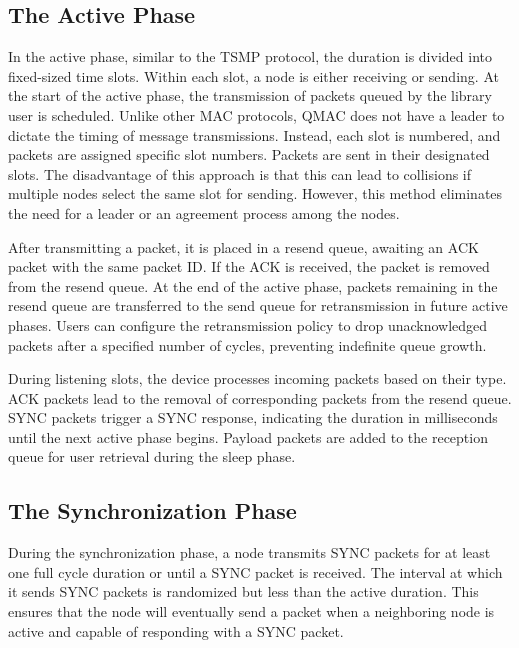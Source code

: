 \subsection*{The Active Phase}

In the active phase, similar to the TSMP protocol, the duration is divided into fixed-sized time slots. Within each slot, a node is either receiving or sending. At the start of the active phase, the transmission of packets queued by the library user is scheduled. Unlike other MAC protocols, QMAC does not have a leader to dictate the timing of message transmissions. Instead, each slot is numbered, and packets are assigned specific slot numbers. Packets are sent in their designated slots. The disadvantage of this approach is that this can lead to collisions if multiple nodes select the same slot for sending. However, this method eliminates the need for a leader or an agreement process among the nodes.

After transmitting a packet, it is placed in a resend queue, awaiting an ACK packet with the same packet ID. If the ACK is received, the packet is removed from the resend queue. At the end of the active phase, packets remaining in the resend queue are transferred to the send queue for retransmission in future active phases. Users can configure the retransmission policy to drop unacknowledged packets after a specified number of cycles, preventing indefinite queue growth.

During listening slots, the device processes incoming packets based on their type. ACK packets lead to the removal of corresponding packets from the resend queue. SYNC packets trigger a SYNC response, indicating the duration in milliseconds until the next active phase begins. Payload packets are added to the reception queue for user retrieval during the sleep phase.


\subsection*{The Synchronization Phase}

During the synchronization phase, a node transmits SYNC packets for at least one full cycle duration or until a SYNC packet is received. The interval at which it sends SYNC packets is randomized but less than the active duration. This ensures that the node will eventually send a packet when a neighboring node is active and capable of responding with a SYNC packet. \\

